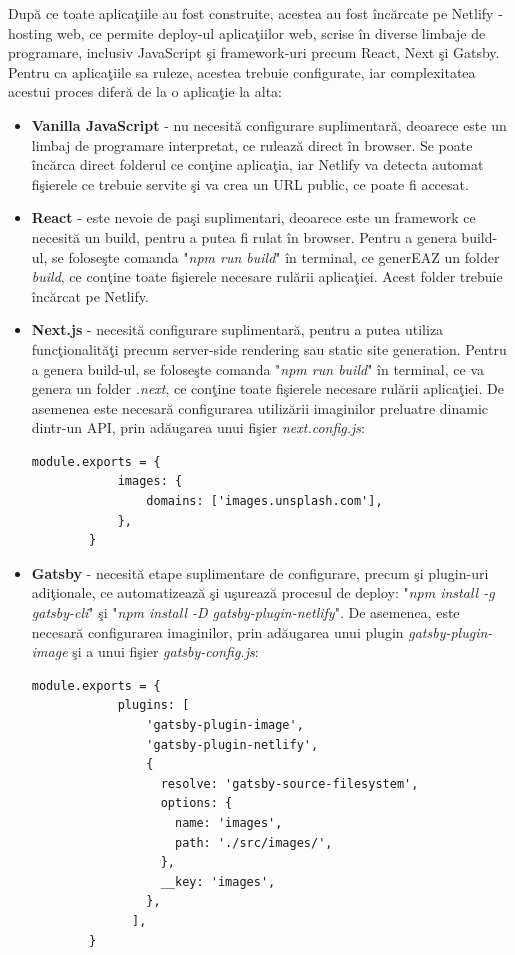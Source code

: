 \documentclass[12pt, a4paper]{report}
\begin{document}
Dup\u a ce toate aplica\c tiile au fost construite, acestea au fost \^inc\u arcate pe Netlify - hosting web, ce permite deploy-ul aplica\c tiilor web, scrise \^in diverse limbaje de programare, inclusiv JavaScript \c si framework-uri precum React, Next \c si Gatsby. Pentru ca aplica\c tiile sa ruleze, acestea trebuie configurate, iar complexitatea acestui proces difer\u a de la o aplica\c tie la alta:
\begin{itemize}
	\item \textbf{Vanilla JavaScript} - nu necesit\u a configurare suplimentar\u a, deoarece este un limbaj de programare interpretat, ce ruleaz\u a direct \^in browser. Se poate \^inc\u arca direct folderul ce con\c tine aplica\c tia, iar Netlify va detecta automat fi\c sierele ce trebuie servite \c si va crea un URL public, ce poate fi accesat.
	\item \textbf{React} - este nevoie de pa\c si suplimentari, deoarece este un framework ce necesit\u a un build, pentru a putea fi rulat \^in browser. Pentru a genera build-ul, se folose\c ste comanda "\textit{npm run build}" \^in terminal, ce generEAZ un folder \textit{build}, ce con\c tine toate fi\c sierele necesare rul\u arii aplica\c tiei. Acest folder trebuie \^inc\u arcat pe Netlify.
	\item \textbf{Next.js} - necesit\u a configurare suplimentar\u a, pentru a putea utiliza func\c tionalit\u a\c ti precum server-side rendering sau static site generation. Pentru a genera build-ul, se folose\c ste comanda "\textit{npm run build}" \^in terminal, ce va genera un folder \textit{.next}, ce con\c tine toate fi\c sierele necesare rul\u arii aplica\c tiei. De asemenea este necesar\u a configurarea utiliz\u arii imaginilor preluatre dinamic dintr-un API, prin ad\u augarea unui fi\c sier \textit{next.config.js}:
	\begin{lstlisting}[caption={Configurarea Next.js pentru utilizarea imaginilor dintr-un API},captionpos=b]
		module.exports = {
			images: {
				domains: ['images.unsplash.com'],
			},
		}
	\end{lstlisting}
	\item \textbf{Gatsby} - necesit\u a etape suplimentare de configurare, precum \c si plugin-uri adi\c tionale, ce automatizeaz\u a \c si u\c sureaz\u a procesul de deploy: "\textit{npm install -g gatsby-cli}" \c si "\textit{npm install -D gatsby-plugin-netlify}". De asemenea, este necesar\u a configurarea imaginilor, prin ad\u augarea unui plugin \textit{gatsby-plugin-image} \c si a unui fi\c sier \textit{gatsby-config.js}:
	\begin{lstlisting}[caption={Configurarea Gatsby pentru utilizarea imaginilor dintr-un API},captionpos=b]
		module.exports = {
			plugins: [
				'gatsby-plugin-image',
				'gatsby-plugin-netlify',
				{
				  resolve: 'gatsby-source-filesystem',
				  options: {
					name: 'images',
					path: './src/images/',
				  },
				  __key: 'images',
				},
			  ],
		}
	\end{lstlisting}
\end{itemize}
\end{document}
